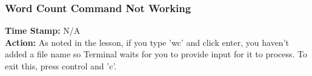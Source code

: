 \documentclass{article}
\begin{document}
\begin{FlushLeft}
\subsubsection{Word Count Command Not Working}
\textbf{Time Stamp:} N/A\\
\textbf{Action:} As noted in the lesson, if you type 'wc' and click enter, you haven't added a file name so Terminal waits for you to provide input for it to process. To exit this, press control and 'c'.\\

\end{FlushLeft}
\end{document}
